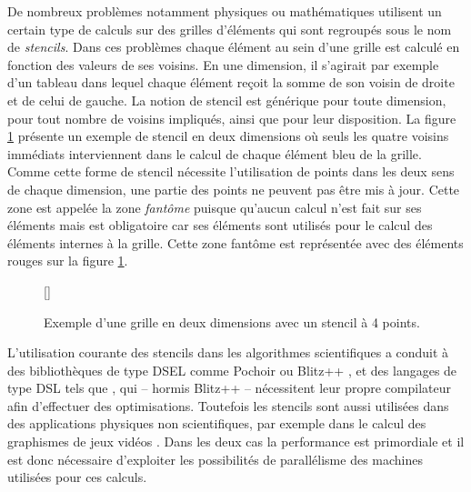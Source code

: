 De nombreux problèmes notamment physiques ou mathématiques utilisent un certain type de calculs sur des grilles d'éléments qui sont regroupés sous le nom de \emph{stencils}. Dans ces problèmes chaque élément au sein d'une grille est calculé en fonction des valeurs de ses voisins. En une dimension, il s'agirait par exemple d'un tableau dans lequel chaque élément reçoit la somme de son voisin de droite et de celui de gauche. La notion de stencil est générique pour toute dimension, pour tout nombre de voisins impliqués, ainsi que pour leur disposition. La figure \ref{fig:stencil_base} présente un exemple de stencil en deux dimensions où seuls les quatre voisins immédiats interviennent dans le calcul de chaque élément bleu de la grille. Comme cette forme de stencil nécessite l'utilisation de points dans les deux sens de chaque dimension, une partie des points ne peuvent pas être mis à jour. Cette zone est appelée la zone \emph{fantôme} puisque qu'aucun calcul n'est fait sur ses éléments mais est obligatoire car ses éléments sont utilisés pour le calcul des éléments internes à la grille. Cette zone fantôme est représentée avec des éléments rouges sur la figure \ref{fig:stencil_base}.

\begin{figure}[!h]
[\FBwidth]
{\caption{Exemple d'une grille en deux dimensions avec un stencil à 4 points.}\label{fig:stencil_base}}
{}
\end{figure}

L'utilisation courante des stencils dans les algorithmes scientifiques a conduit à des bibliothèques de type DSEL comme \textsf{Pochoir} \cite{Art18} ou  \textsf{Blitz++} \cite{Art5}, et des langages de type DSL tels que \cite{Art19}, qui -- hormis \textsf{Blitz++} -- nécessitent leur propre compilateur afin d'effectuer des optimisations. Toutefois les stencils sont aussi utilisées dans des applications physiques non scientifiques, par exemple dans le calcul des graphismes de jeux vidéos \cite{Art15}. Dans les deux cas la performance est primordiale et il est donc nécessaire d'exploiter les possibilités de parallélisme des machines utilisées pour ces calculs.  

